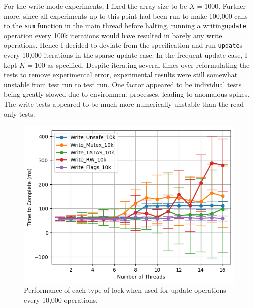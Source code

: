 \documentclass[11pt]{article}
\begin{document}
For the write-mode experiments, I fixed the array size to be $X = 1000$. Further more, since all experiments up to this point had been run to make 100,000 calls to the \texttt{sum} function in the main thread before halting, running a writing\texttt{update} operation every 100k iterations would have resulted in barely any write operations. Hence I decided to deviate from the specification and run \texttt{update}s every 10,000 iterations in the sparse update case.
In the frequent update case, I kept $K=100$ as specified. Despite iterating several times over reformulating the tests to remove experimental error, experimental results were still somewhat unstable from test run to test run. One factor appeared to be individual tests being greatly slowed due to environment processes, leading to anomalous spikes. The write tests appeared to be much more numerically unstable than the read-only tests.
\begin{figure}
\centering
\includegraphics[scale=0.65]{step7_1.png}
\caption{Performance of each type of lock when used for update operations every 10,000 operations.}
\label{fig:step7_1}
\end{figure}
\end{document}
